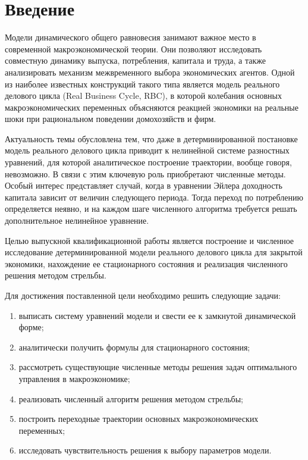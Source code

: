 \documentclass[14pt,a4paper]{extreport}
\begin{document}
\tableofcontents
\clearpage
\chapter*{Введение}

Модели динамического общего равновесия занимают важное место в современной макроэкономической теории. Они позволяют исследовать совместную динамику выпуска, потребления, капитала и труда, а также анализировать механизм межвременного выбора экономических агентов. Одной из наиболее известных конструкций такого типа является модель реального делового цикла (Real Business Cycle, RBC), в которой колебания основных макроэкономических переменных объясняются реакцией экономики на реальные шоки при рациональном поведении домохозяйств и фирм.

Актуальность темы обусловлена тем, что даже в детерминированной постановке модель реального делового цикла приводит к нелинейной системе разностных уравнений, для которой аналитическое построение траектории, вообще говоря, невозможно. В связи с этим ключевую роль приобретают численные методы. Особый интерес представляет случай, когда в уравнении Эйлера доходность капитала зависит от величин следующего периода. Тогда переход по потреблению определяется неявно, и на каждом шаге численного алгоритма требуется решать дополнительное нелинейное уравнение.

Целью выпускной квалификационной работы является построение и численное исследование детерминированной модели реального делового цикла для закрытой экономики, нахождение ее стационарного состояния и реализация численного решения методом стрельбы.

Для достижения поставленной цели необходимо решить следующие задачи:
\begin{enumerate}[label=\arabic*)]
    \item выписать систему уравнений модели и свести ее к замкнутой динамической форме;
    \item аналитически получить формулы для стационарного состояния;
    \item рассмотреть существующие численные методы решения задач оптимального управления в макроэкономике;
    \item реализовать численный алгоритм решения методом стрельбы;
    \item построить переходные траектории основных макроэкономических переменных;
    \item исследовать чувствительность решения к выбору параметров модели.
\end{enumerate}
\end{document}
